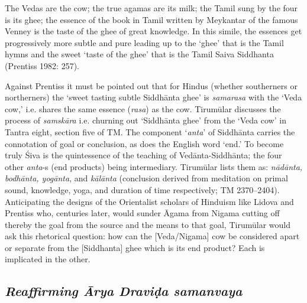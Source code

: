 \begin{myquote}
The Vedas are the cow; the true agamas are its milk; the Tamil sung by the four is its ghee; the essence of the book in Tamil written by Meykantar of the famous Venney is the taste of the ghee of great knowledge. In this simile, the essences get progressively more subtle and pure leading up to the ‘ghee’ that is the Tamil hymns and the sweet ‘taste of the ghee’ that is the Tamil Saiva Siddhanta (Prentiss 1982: 257).
\end{myquote}

Against Prentiss it must be pointed out that for Hindus (whether southerners or northerners) the ‘sweet tasting subtle Siddhānta ghee’ is \textit{samarasa} with the ‘Veda cow,’ i.e. shares the same essence (\textit{rasa}) as the cow. Tirumūlar discusses the process of \textit{samskāra} i.e. churning out ‘Siddhānta ghee’ from the ‘Veda cow’ in Tantra eight, section five of TM. The component ‘\textit{anta}’ of Siddhānta carries the connotation of goal or conclusion, as does the English word ‘end.’ To become truly Śiva is the quintessence of the teaching of Vedānta-Siddhānta; the four other \textit{anta}-s (end products) being intermediary. Tirumūlar lists them as: \textit{nādānta, bodhānta, yogānta}, and \textit{kālānta} (conclusion derived from meditation on primal sound, knowledge, yoga, and duration of time respectively; TM 2370–2404). Anticipating the designs of the Orientalist scholars of Hinduism like Lidova and Prentiss who, centuries later, would sunder Āgama from Nigama cutting off thereby the goal from the source and the means to that goal, Tirumūlar would ask this rhetorical question: how can the [Veda/Nigama] cow be considered apart or separate from the [Siddhanta] ghee which is its end product? Each is implicated in the other.


\subsection*{\textit{Reaffirming Ārya Draviḍa samanvaya}}

